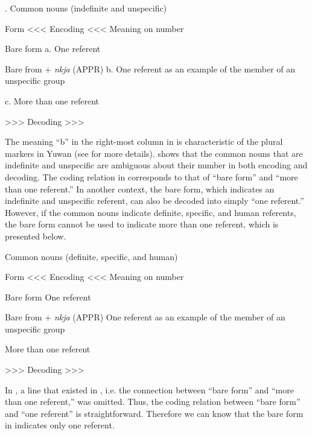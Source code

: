 \begin{styleBeschriftung}
\textmd{}\textmd{. Common nouns (indefinite and unspecific)}
\end{styleBeschriftung}

Form  <<< Encoding <<<  Meaning on number

Bare form  %
a. One referent

Bare from + \textit{nkja} (APPR)  %
b. One referent as an example of the member of an unspecific group

c. More than one referent

  >>> Decoding >>>  

The meaning “b” in the right-most column in  is characteristic of the plural markers in Yuwan (see  for more details).  shows that the common nouns that are indefinite and unspecific are ambiguous about their number in both encoding and decoding. The coding relation in  corresponds to that of “bare form” and “more than one referent.” In another context, the bare form, which indicates an indefinite and unspecific referent, can also be decoded into simply “one referent.” However, if the common nouns indicate definite, specific, and human referents, the bare form cannot be used to indicate more than one referent, which is presented below.

\begin{styleBeschriftung}
\textmd{}\textmd{ Common nouns (definite, specific, and human)}
\end{styleBeschriftung}

Form  <<< Encoding <<<  Meaning on number

Bare form  %
\ea \label{ex:7:a}One referent

Bare from + \textit{nkja} (APPR)  %
\ex \label{ex:7:b}One referent as an example of the member of an unspecific group

  \ex \label{ex:7:c}More than one referent

  >>> Decoding >>>  
  \z
\z

In , a line that existed in , i.e. the connection between “bare form” and “more than one referent,” was omitted. Thus, the coding relation between “bare form” and “one referent” is straightforward. Therefore we can know that the bare form in  indicates only one referent.


